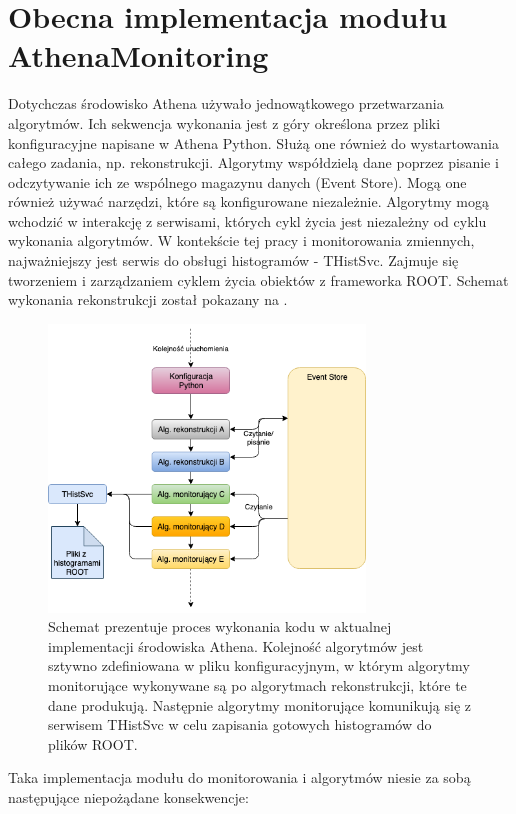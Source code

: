 \section{Obecna implementacja modułu AthenaMonitoring}
Dotychczas środowisko Athena używało jednowątkowego przetwarzania algorytmów. 
Ich sekwencja wykonania jest z góry określona przez pliki konfiguracyjne napisane w Athena Python. 
Służą one również do wystartowania całego zadania, np. rekonstrukcji. 
Algorytmy współdzielą dane poprzez pisanie i odczytywanie ich ze wspólnego magazynu danych (Event Store). 
Mogą one również używać narzędzi, które są konfigurowane niezależnie. 
Algorytmy mogą wchodzić w interakcję z serwisami, których cykl życia jest niezależny od cyklu wykonania algorytmów.
W kontekście tej pracy i monitorowania zmiennych, najważniejszy jest serwis do obsługi histogramów - THistSvc.
Zajmuje się tworzeniem i zarządzaniem cyklem życia obiektów z frameworka ROOT.
Schemat wykonania rekonstrukcji został pokazany na .

\begin{figure}[!ht]
\centering
\includegraphics[width=0.75\textwidth]{img/old_flow.png}
\caption{
Schemat prezentuje proces wykonania kodu w aktualnej implementacji środowiska Athena. 
Kolejność algorytmów jest sztywno zdefiniowana w pliku konfiguracyjnym, w którym algorytmy monitorujące wykonywane są po algorytmach rekonstrukcji, które te dane produkują. 
Następnie algorytmy monitorujące komunikują się z serwisem THistSvc w celu zapisania gotowych histogramów do plików ROOT.
}
\label{fig:athena:oldFlow}
\end{figure}

Taka implementacja modułu do monitorowania i algorytmów niesie za sobą następujące niepożądane konsekwencje:

